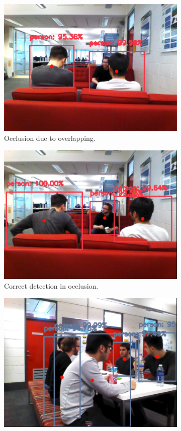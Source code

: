 \begin{figure}[H]
    \begin{subfigure}{.5\textwidth}
        \centering
        \includegraphics[width=.9\linewidth]{images/chapter6_occlusion_seated.png}
        \caption{Occlusion due to overlapping.}
	\end{subfigure}
    \begin{subfigure}{.5\textwidth}
        \centering
        \includegraphics[width=.9\linewidth]{images/chapter6_occlusion_seated_good.png}
        \caption{Correct detection in occlusion.}
	\end{subfigure}
    \begin{subfigure}{.5\textwidth}
        \centering
        \includegraphics[width=.9\linewidth]{images/chapter6_occlusion_table_back.png}

\end{subfigure}
\end{figure}
